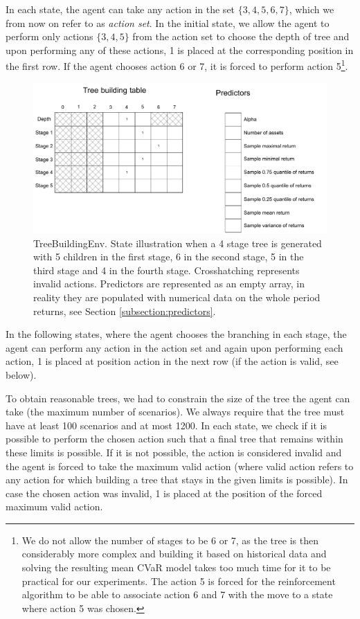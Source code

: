 In each state, the agent can take any action in the set $\{3,4,5,6,7\}$, which we from now on refer to as \textit{action set}. In the initial state, we allow the agent to perform only actions $\{3,4,5\}$ from the action set to choose the depth of tree and upon performing any of these actions, 1 is placed at the corresponding position in the first row. If the agent chooses action 6 or 7, it is forced to perform action 5\footnote{We do not allow the number of stages to be 6 or 7, as the tree is then considerably more complex and building it based on historical data and solving the resulting mean CVaR model takes too much time for it to be practical for our experiments. The action 5 is forced for the reinforcement algorithm to be able to associate action 6 and 7 with the move to a state where action 5 was chosen.}.


\begin{figure}[H]
  \includegraphics[width=\linewidth]{../img/Treebuildingenv_graph.pdf}
  \caption{TreeBuildingEnv. State illustration when a 4 stage tree is generated with 5 children in the first stage, 6 in the second stage, 5 in the third stage and 4 in the fourth stage. Crosshatching represents invalid actions. Predictors are represented as an empty array, in reality they are populated with numerical data on the whole period returns, see Section \ref{subsection:predictors}.}
  \label{fig:treebuildingenv}
\end{figure}


In the following states, where the agent chooses the branching in each stage, the agent can perform any action in the action set and again upon performing each action, 1 is placed at position action in the next row (if the action is valid, see below). 

To obtain reasonable trees, we had to constrain the size of the tree the agent can take (the maximum number of scenarios). We always require that the tree must have at least 100 scenarios and at most 1200. In each state, we check if it is possible to perform the chosen action such that a final tree that remains within these limits is possible. If it is not possible, the action is considered invalid and the agent is forced to take the maximum valid action (where valid action refers to any action for which building a tree that stays in the given limits is possible). In case the chosen action was invalid, 1 is placed at the position of the forced maximum valid action.

